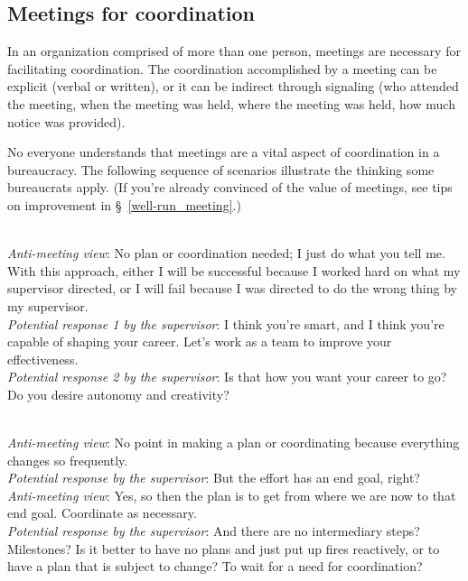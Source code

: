 \subsection{Meetings for coordination\label{sec:meetings-for-coordination}}
In an organization comprised of more than one person, meetings are necessary for facilitating coordination. The coordination accomplished by a meeting can be explicit (verbal or written), or it can be indirect through signaling (who attended the meeting, when the meeting was held, where the meeting was held, how much notice was provided). 

No everyone understands that meetings are a vital aspect of coordination in a bureaucracy. The following sequence of scenarios illustrate the thinking some bureaucrats apply. (If you're already convinced of the value of meetings, see tips on improvement in \S~\ref{well-run_meeting}.)


\ \\

\textit{Anti-meeting view}: No plan or coordination needed; I just do what you tell me. With this approach, either I will be successful because I worked hard on what my supervisor directed, or I will fail because I was directed to do the wrong thing by my supervisor.\\
\textit{Potential response 1 by the supervisor}: I think you're smart, and I think you're capable of shaping your career. Let's work as a team to improve your effectiveness. \\
\textit{Potential response 2 by the supervisor}: Is that how you want your career to go? Do you desire autonomy and creativity?

\ \\

\textit{Anti-meeting view}: No point in making a plan or coordinating because everything changes so frequently. \\
\textit{Potential response by the supervisor}: But the effort has an end goal, right?\\
\textit{Anti-meeting view}:  Yes, so then the plan is to get from where we are now to that end goal. Coordinate as necessary. \\
\textit{Potential response by the supervisor}: And there are no intermediary steps? Milestones?
Is it better to have no plans and just put up fires reactively, or to have a plan that is subject to change? To wait for a need for coordination?

